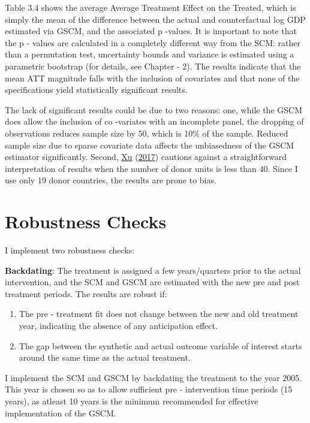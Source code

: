 \documentclass[12pt,nobind, a4paper]{reedthesis}
\begin{document}
 Table 3.4 shows the average Average Treatment Effect on the Treated, which is simply the mean of the difference between the actual and counterfactual log GDP estimated via GSCM, and the associated p -values. It is important to note that the p - values are calculated in a completely different way from the SCM: rather than a permutation test, uncertainty bounds and variance is estimated using a parametric bootstrap (for details, see Chapter - 2). The results indicate that the mean ATT magnitude falls with the inclusion of covariates and that none of the specifications yield statistically significant results.
 \linebreak

 The lack of significant results could be due to two reasons: one, while the GSCM does allow the inclusion of co -variates with an incomplete panel, the dropping of observations reduces sample size by 50, which is 10\% of the sample. Reduced sample size due to sparse covariate data affects the unbiasedness of the GSCM estimator significantly. Second, \protect\hyperlink{ref-xu_generalized_2017}{Xu} (\protect\hyperlink{ref-xu_generalized_2017}{2017}) cautions against a straightforward interpretation of results when the number of donor units is less than 40. Since I use only 19 donor countries, the results are prone to bias.

 \hypertarget{robustness-checks}{%
 \section{Robustness Checks}\label{robustness-checks}}

 I implement two robustness checks:

 \textbf{Backdating}: The treatment is assigned a few years/quarters prior to the actual intervention, and the SCM and GSCM are estimated with the new pre and post treatment periods. The results are robust if:
 \begin{enumerate}
 \def\labelenumi{\alph{enumi}.}
 \item
   The pre - treatment fit does not change between the new and old treatment year, indicating the absence of any anticipation effect.
 \item
   The gap between the synthetic and actual outcome variable of interest starts around the same time as the actual treatment.
   \linebreak
 \end{enumerate}
 I implement the SCM and GSCM by backdating the treatment to the year 2005. This year is chosen so as to allow sufficient pre - intervention time periods (15 years), as atleast 10 years is the minimum recommended for effective implementation of the GSCM.
\end{document}
